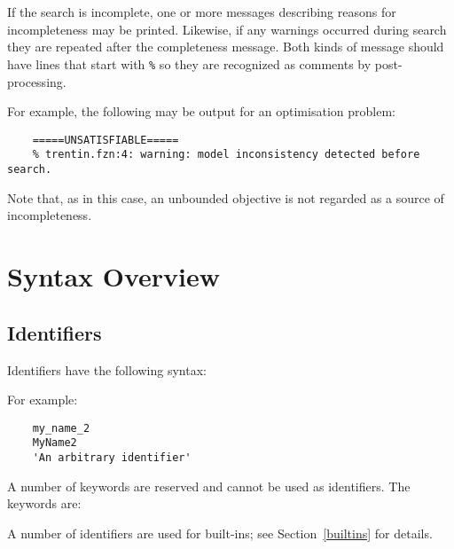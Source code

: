 \documentclass[10pt]{scrartcl}
\begin{document}
\begin{productions}
\RuleWarnings \\
\\
\RuleMessage
\end{productions}

\noindent
If the search is incomplete,
one or more messages describing reasons for incompleteness may be printed.
Likewise, if any warnings occurred during search
they are repeated after the completeness message.
Both kinds of message should have lines that start with \texttt{\%}
so they are recognized as comments by post-processing.

For example, the following may be output for an optimisation problem:

\begin{verbatim}
    =====UNSATISFIABLE=====
    % trentin.fzn:4: warning: model inconsistency detected before search.
\end{verbatim}

\noindent
Note that, as in this case,
an unbounded objective is not regarded as a source of incompleteness.


\section{Syntax Overview}
  \label{Syntax Overview}

\subsection{Identifiers}
     \label{Identifiers}
Identifiers have the following syntax:
\begin{productions}
    \RuleIdent
\end{productions}
For example:
\begin{verbatim}
    my_name_2
    MyName2
    'An arbitrary identifier'
\end{verbatim}
A number of keywords are reserved and cannot be used as identifiers.  The
keywords are:
\reservedKeywords{}

A number of identifiers are used for built-ins;  see Section~\ref{builtins}
for details.
\end{document}

